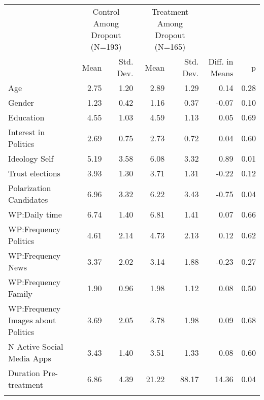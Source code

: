 \begin{table}

\caption{}
\centering
\begin{tabular}[t]{lrrrrrr}
\toprule
\multicolumn{1}{c}{ } & \multicolumn{2}{c}{Control Among Dropout (N=193)} & \multicolumn{2}{c}{Treatment Among Dropout (N=165)} & \multicolumn{2}{c}{ } \\
\cmidrule(l{3pt}r{3pt}){2-3} \cmidrule(l{3pt}r{3pt}){4-5}
  & Mean & Std. Dev. & Mean & Std. Dev. & Diff. in Means & p\\
\midrule
Age & 2.75 & 1.20 & 2.89 & 1.29 & 0.14 & 0.28\\
Gender & 1.23 & 0.42 & 1.16 & 0.37 & -0.07 & 0.10\\
Education & 4.55 & 1.03 & 4.59 & 1.13 & 0.05 & 0.69\\
Interest in Politics & 2.69 & 0.75 & 2.73 & 0.72 & 0.04 & 0.60\\
Ideology Self & 5.19 & 3.58 & 6.08 & 3.32 & 0.89 & 0.01\\
Trust elections & 3.93 & 1.30 & 3.71 & 1.31 & -0.22 & 0.12\\
Polarization Candidates & 6.96 & 3.32 & 6.22 & 3.43 & -0.75 & 0.04\\
WP:Daily time & 6.74 & 1.40 & 6.81 & 1.41 & 0.07 & 0.66\\
WP:Frequency Politics & 4.61 & 2.14 & 4.73 & 2.13 & 0.12 & 0.62\\
WP:Frequency News & 3.37 & 2.02 & 3.14 & 1.88 & -0.23 & 0.27\\
WP:Frequency Family & 1.90 & 0.96 & 1.98 & 1.12 & 0.08 & 0.50\\
WP:Frequency Images about Politics & 3.69 & 2.05 & 3.78 & 1.98 & 0.09 & 0.68\\
N Active Social Media Apps & 3.43 & 1.40 & 3.51 & 1.33 & 0.08 & 0.60\\
Duration Pre-treatment & 6.86 & 4.39 & 21.22 & 88.17 & 14.36 & 0.04\\
\bottomrule
\multicolumn{7}{l}{\rule{0pt}{1em}}\\
\end{tabular}
\end{table}
